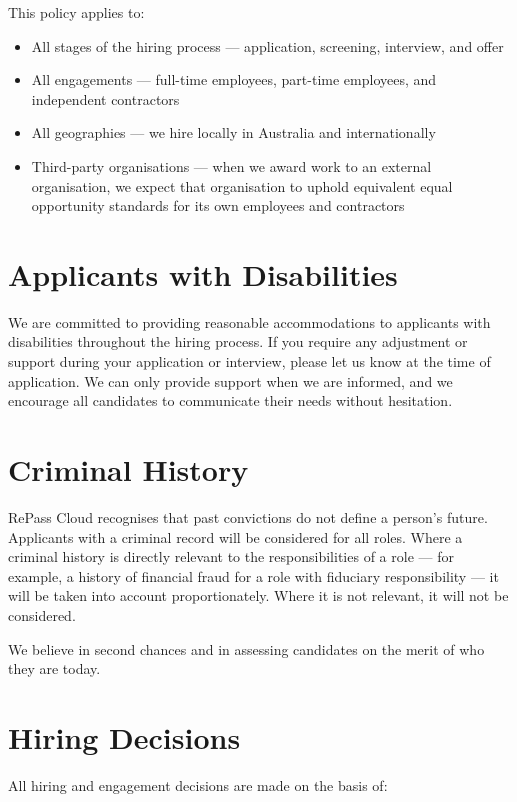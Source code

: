 \documentclass[11pt]{article}
\begin{document}
This policy applies to:

\begin{itemize}
\item All stages of the hiring process --- application, screening, interview, and offer
\item All engagements --- full-time employees, part-time employees, and independent contractors
\item All geographies --- we hire locally in Australia and internationally
\item Third-party organisations --- when we award work to an external organisation, we expect that organisation to uphold equivalent equal opportunity standards for its own employees and contractors
\end{itemize}

\section{Applicants with Disabilities}

We are committed to providing reasonable accommodations to applicants with disabilities throughout the hiring process. If you require any adjustment or support during your application or interview, please let us know at the time of application. We can only provide support when we are informed, and we encourage all candidates to communicate their needs without hesitation.

\section{Criminal History}

RePass Cloud recognises that past convictions do not define a person's future. Applicants with a criminal record will be considered for all roles. Where a criminal history is directly relevant to the responsibilities of a role --- for example, a history of financial fraud for a role with fiduciary responsibility --- it will be taken into account proportionately. Where it is not relevant, it will not be considered.

We believe in second chances and in assessing candidates on the merit of who they are today.

\section{Hiring Decisions}

All hiring and engagement decisions are made on the basis of:
\end{document}
